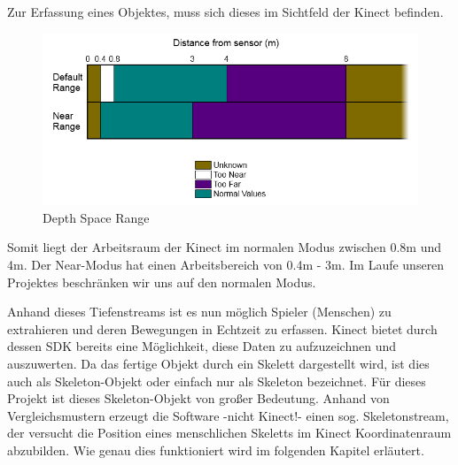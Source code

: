 Zur Erfassung eines Objektes, muss sich dieses im Sichtfeld der Kinect befinden. 
\begin{figure}[H]						
	\centering							
	\includegraphics[scale=0.7]{Bilder/kinect_range.png}			
	\caption{Depth Space Range \cite{ws:microsoft_coordinateSpaces}}						
	\label{f:kinect_range}						
\end{figure}

Somit liegt der Arbeitsraum der Kinect im normalen Modus zwischen 0.8m und 4m. Der Near-Modus hat einen Arbeitsbereich von 0.4m - 3m. Im Laufe unseren Projektes beschränken wir uns auf den normalen Modus.

Anhand dieses Tiefenstreams ist es nun möglich Spieler (Menschen) zu extrahieren und deren Bewegungen
in Echtzeit zu erfassen. Kinect bietet durch dessen SDK bereits eine Möglichkeit, diese Daten zu
aufzuzeichnen und auszuwerten. Da das fertige Objekt durch ein Skelett dargestellt wird, ist dies auch als Skeleton-Objekt oder einfach nur als Skeleton bezeichnet. Für dieses Projekt ist dieses Skeleton-Objekt von großer Bedeutung. Anhand von Vergleichsmustern erzeugt die Software -nicht Kinect!- einen sog. Skeletonstream, der versucht die Position eines menschlichen Skeletts im Kinect Koordinatenraum abzubilden.\cite{SWB-376536934}
Wie genau dies funktioniert wird im folgenden Kapitel erläutert.



%
%
